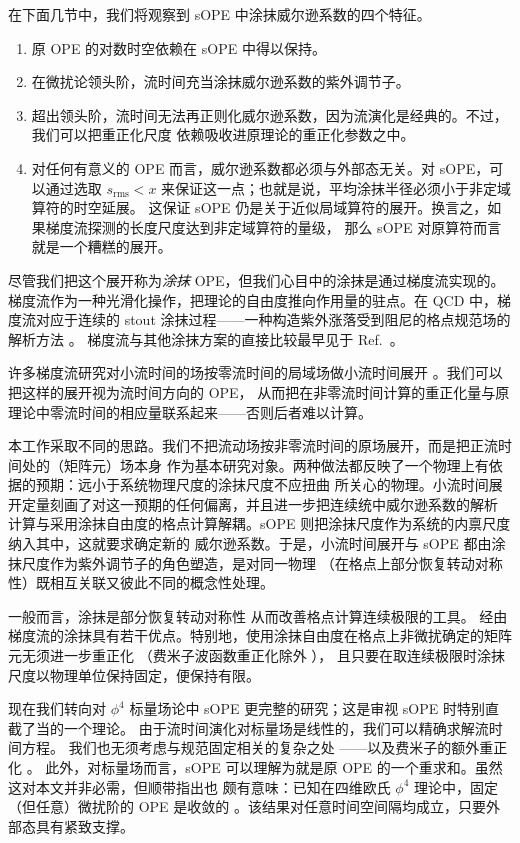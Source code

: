 在下面几节中，我们将观察到 sOPE 中涂抹威尔逊系数的四个特征。
\begin{enumerate}
\item 原 OPE 的对数时空依赖在 sOPE 中得以保持。
\item 在微扰论领头阶，流时间充当涂抹威尔逊系数的紫外调节子。
\item 超出领头阶，流时间无法再正则化威尔逊系数，因为流演化是经典的。不过，我们可以把重正化尺度
依赖吸收进原理论的重正化参数之中。
\item 对任何有意义的 OPE 而言，威尔逊系数都必须与外部态无关。对 sOPE，可以通过选取
$s_{\mathrm{rms}} < x$ 来保证这一点；也就是说，平均涂抹半径必须小于非定域算符的时空延展。
这保证 sOPE 仍是关于近似局域算符的展开。换言之，如果梯度流探测的长度尺度达到非定域算符的量级，
那么 sOPE 对原算符而言就是一个糟糕的展开。
\end{enumerate}

尽管我们把这个展开称为\emph{涂抹} OPE，但我们心目中的涂抹是通过梯度流实现的。
梯度流作为一种光滑化操作，把理论的自由度推向作用量的驻点。在 QCD 中，梯度流对应于连续的
stout 涂抹过程——一种构造紫外涨落受到阻尼的格点规范场的解析方法 \cite{Morningstar:2003gk}。
梯度流与其他涂抹方案的直接比较最早见于 Ref.~\cite{Bonati:2014tqa}。

许多梯度流研究对小流时间的场按零流时间的局域场做小流时间展开
\cite{Shindler:2013bia,Suzuki:2013gza,DelDebbio:2013zaa,
Makino:2014taa,Asakawa:2013laa,Luscher:2014kea}。我们可以把这样的展开视为流时间方向的 OPE，
从而把在非零流时间计算的重正化量与原理论中零流时间的相应量联系起来——否则后者难以计算。

本工作采取不同的思路。我们不把流动场按非零流时间的原场展开，而是把正流时间处的（矩阵元）场本身
作为基本研究对象。两种做法都反映了一个物理上有依据的预期：远小于系统物理尺度的涂抹尺度不应扭曲
所关心的物理。小流时间展开定量刻画了对这一预期的任何偏离，并且进一步把连续统中威尔逊系数的解析
计算与采用涂抹自由度的格点计算解耦。sOPE 则把涂抹尺度作为系统的内禀尺度纳入其中，这就要求确定新的
威尔逊系数。于是，小流时间展开与 sOPE 都由涂抹尺度作为紫外调节子的角色塑造，是对同一物理
（在格点上部分恢复转动对称性）既相互关联又彼此不同的概念性处理。

一般而言，涂抹是部分恢复转动对称性 \cite{Davoudi:2012ya} 从而改善格点计算连续极限的工具。
经由梯度流的涂抹具有若干优点。特别地，使用涂抹自由度在格点上非微扰确定的矩阵元无须进一步重正化
\cite{Luscher:2010iy}（费米子波函数重正化除外 \cite{Luscher:2013cpa}），
且只要在取连续极限时涂抹尺度以物理单位保持固定，便保持有限。

现在我们转向对 $\phi^4$ 标量场论中 sOPE 更完整的研究；这是审视 sOPE 时特别直截了当的一个理论。
由于流时间演化对标量场是线性的，我们可以精确求解流时间方程。
我们也无须考虑与规范固定相关的复杂之处
\cite{Luscher:2010iy,Luscher:2011bx}——以及费米子的额外重正化 \cite{Luscher:2013cpa}。
此外，对标量场而言，sOPE 可以理解为就是原 OPE 的一个重求和。虽然这对本文并非必需，但顺带指出也
颇有意味：已知在四维欧氏 $\phi^4$ 理论中，固定（但任意）微扰阶的 OPE 是收敛的
\cite{Hollands:2011gf}。该结果对任意时间空间隔均成立，只要外部态具有紧致支撑。

